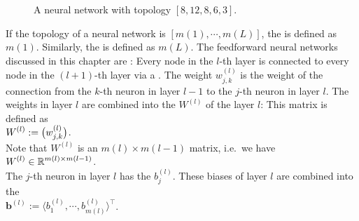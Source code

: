 \begin{figure}[!h]
  \centering
  \vspace*{-2cm}
  \vspace*{-2cm}
   \caption{A neural network with topology $[8, 12, 8, 6, 3]$.}
  \label{fig:nn2.pdf}
\end{figure}


If the topology of a neural network is  $[m(1), \cdots, m(L)]$, the  
is defined as $m(1)$.  Similarly, the   is defined as $m(L)$.
The feedforward neural networks discussed in this chapter are :  
Every node in the $l$-th layer is connected to every node in the $(l+1)$-th layer via a .
The weight $w_{j,k}^{(l)}$ is the weight of the connection from the $k$-th neuron in layer $l-1$ to
the $j$-th neuron in layer $l$.  The weights in layer $l$ are combined into the  $W^{(l)}$
 of the layer $l$: This matrix is defined as
\\[0.2cm]
\hspace*{1.3cm}
$\displaystyle W^{(l)} := \bigl( w_{j,k}^{(l)} \bigr)$.
\\[0.2cm]
Note that $W^{(l)}$ is an $m(l) \times m(l-1)$ matrix, i.e.~we have
\\[0.2cm]
\hspace*{1.3cm}
$\displaystyle W^{(l)} \in \mathbb{R}^{m(l) \times m(l-1)}$.
\\[0.2cm]
The $j$-th neuron in layer $l$ has the  $b_j^{(l)}$.  These biases of layer $l$ are combined into
the  
\\[0.2cm]
\hspace*{1.3cm}
$\mathbf{b}^{(l)} := \bigl\langle b_1^{(l)}, \cdots, b_{m(l)}^{(l)} \bigr\rangle^\top$.
\FloatBarrier

